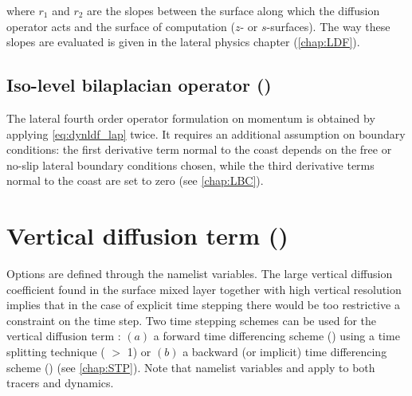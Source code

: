 \documentclass[../tex_main/NEMO_manual]{subfiles}
\begin{document}
where $r_1$ and $r_2$ are the slopes between the surface along which the 
diffusion operator acts and the surface of computation ($z$- or $s$-surfaces). 
The way these slopes are evaluated is given in the lateral physics chapter 
(\autoref{chap:LDF}).

\subsection[Iso-level bilaplacian (\protect\np{ln\_dynldf\_bilap}\forcode{ = .true.})]
				{Iso-level bilaplacian operator (\protect{})}
\label{subsec:DYN_ldf_bilap}

The lateral fourth order operator formulation on momentum is obtained by 
applying \autoref{eq:dynldf_lap} twice. It requires an additional assumption on 
boundary conditions: the first derivative term normal to the coast depends on 
the free or no-slip lateral boundary conditions chosen, while the third 
derivative terms normal to the coast are set to zero (see \autoref{chap:LBC}).

\section{Vertical diffusion term (\protect{})}
\label{sec:DYN_zdf}

Options are defined through the  namelist variables.
The large vertical diffusion coefficient found in the surface mixed layer together 
with high vertical resolution implies that in the case of explicit time stepping there 
would be too restrictive a constraint on the time step. Two time stepping schemes 
can be used for the vertical diffusion term : $(a)$ a forward time differencing 
scheme () using a time splitting technique 
( $>$ 1) or $(b)$ a backward (or implicit) time differencing scheme 
() (see \autoref{chap:STP}). Note that namelist variables 
 and  apply to both tracers and dynamics. 
\end{document}
